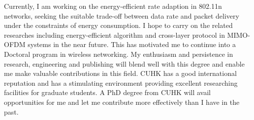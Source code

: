 \documentclass[journal,onecolumn]{IEEEtran}
\begin{document}
Currently, I am working on the energy-efficient rate adaption in 802.11n networks, seeking the suitable trade-off between data rate and packet delivery under the constraints of energy consumption. I hope to carry on the related researches including energy-efficient algorithm and cross-layer protocol in MIMO-OFDM systems in the near future. This has motivated me to continue into a Doctoral program in wireless networking. My enthusiasm and persistence in research, engineering and publishing will blend well with this degree and enable me make valuable contributions in this field. CUHK has a good international reputation and has a stimulating environment providing excellent researching facilities for graduate students. A PhD degree from CUHK will avail opportunities for me and let me contribute more effectively than I have in the past.
\end{document}
